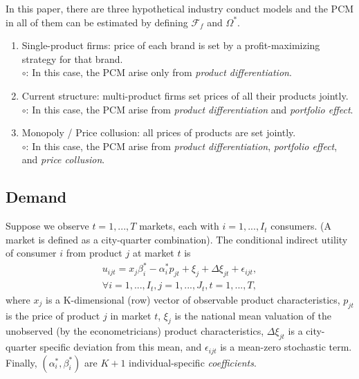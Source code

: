 \documentclass[11pt]{elegantbook}
\begin{document}
In this paper, there are three hypothetical industry conduct models and the PCM in all of them can be estimated by defining $\mathcal{F}_f$ and $\Omega^*$.
\begin{enumerate}
    \item Single-product firms: price of each brand is set by a profit-maximizing strategy for that brand.\\
    $\circ$: In this case, the PCM arise only from \textit{product differentiation}.
    \item Current structure: multi-product firms set prices of all their products jointly.\\
    $\circ$: In this case, the PCM arise from \textit{product differentiation} and \textit{portfolio effect}.
    \item Monopoly / Price collusion: all prices of products are set jointly.\\
    $\circ$: In this case, the PCM arise from \textit{product differentiation}, \textit{portfolio effect}, and \textit{price collusion}.
\end{enumerate}

\subsection{Demand}
Suppose we observe $t=1,...,T$ markets, each with $i=1,...,I_t$ consumers. (A market is defined as a city-quarter combination). The conditional indirect utility of consumer $i$ from product $j$ at market $t$ is
\begin{equation}
    \begin{aligned}
        u_{ijt}=x_j\beta_i^*-\alpha_i^*p_{jt}+\xi_{j}+\Delta\xi_{jt}+\epsilon_{ijt},\\ \forall i=1,...,I_t, j=1,...,J_t, t=1,...,T,
    \end{aligned}
    \label{Nevo_2021_(2)}
\end{equation}
where $x_j$ is a K-dimensional (row) vector of observable product characteristics,
$p_{jt}$ is the price of product $j$ in market $t$, $\xi_j$ is the national mean valuation of the unobserved (by the econometricians) product characteristics, $\Delta\xi_{jt}$ is a city-quarter specific deviation from this mean, and $\epsilon_{ijt}$ is a mean-zero stochastic term. Finally, $(\alpha_i^*,\beta_i^*)$ are $K + 1$ individual-specific \textit{coefficients}.
\end{document}
